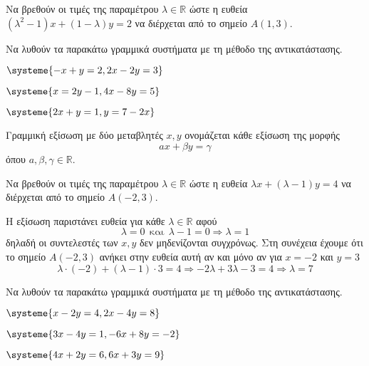 
Να βρεθούν οι τιμές της παραμέτρου $ \lambda\in\mathbb{R} $ ώστε η ευθεία $ (\lambda^2-1)x+(1-\lambda)y=2 $ να διέρχεται από το σημείο $ A(1,3) $.

Να λυθούν τα παρακάτω γραμμικά συστήματα με τη μέθοδο της αντικατάστασης.
\begin{multicols}{2}
\begin{rlist}[leftmargin=5mm]
\item $ \systeme{-x+y=2,2x-2y=3} $
\item $ \systeme{x=2y-1,4x-8y=5} $
\item $ \systeme{2x+y=1,y=7-2x} $
\end{rlist}
\end{multicols}

Γραμμική εξίσωση με δύο μεταβλητές $x,y$ ονομάζεται κάθε εξίσωση της μορφής
\[ ax+\beta y=\gamma \]
όπου $ a,\beta,\gamma\in\mathbb{R} $.

Να βρεθούν οι τιμές της παραμέτρου $ \lambda\in\mathbb{R} $ ώστε η ευθεία $ \lambda x+(\lambda-1)y=4 $ να διέρχεται από το σημείο $ A(-2,3) $.

Η εξίσωση παριστάνει ευθεία για κάθε $ \lambda\in\mathbb{R} $ αφού
\[ \lambda=0\ \ \text{και}\ \ \lambda-1=0\Rightarrow\lambda=1 \]
δηλαδή οι συντελεστές των $ x,y $ δεν μηδενίζονται συγχρόνως. Στη συνέχεια έχουμε ότι το σημείο $ A(-2,3) $ ανήκει στην ευθεία αυτή αν και μόνο αν για $ x=-2 $ και $ y=3 $
\[ \lambda\cdot(-2)+(\lambda-1)\cdot 3=4\Rightarrow -2\lambda+3\lambda-3=4\Rightarrow \lambda=7 \]

Να λυθούν τα παρακάτω γραμμικά συστήματα με τη μέθοδο της αντικατάστασης.
\begin{multicols}{2}
\begin{rlist}[leftmargin=5mm]
\item $ \systeme{x-2y=4,2x-4y=8} $
\item $ \systeme{3x-4y=1,-6x+8y=-2} $
\item $ \systeme{4x+2y=6,6x+3y=9} $
\end{rlist}
\end{multicols}

